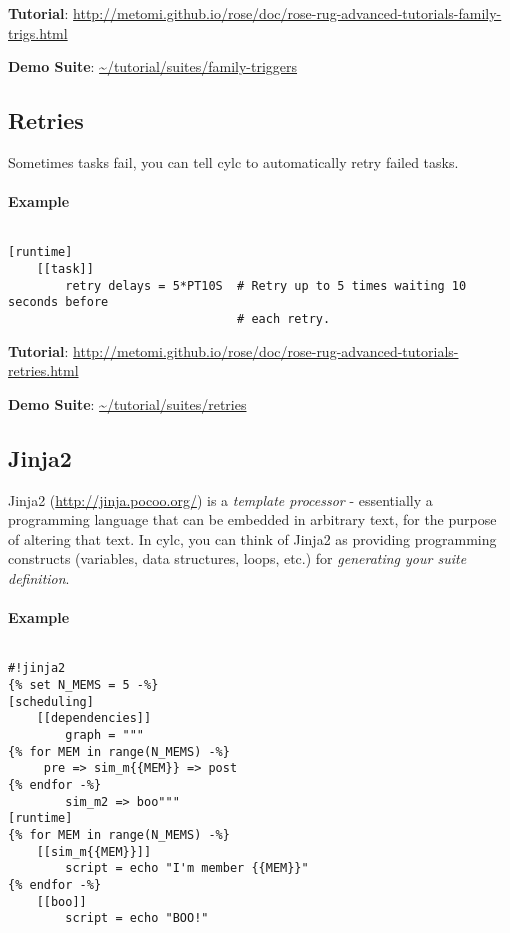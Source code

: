 \begin{shaded*}
\textbf{Tutorial}:
\url{http://metomi.github.io/rose/doc/rose-rug-advanced-tutorials-family-trigs.html}

\textbf{Demo Suite}: \url{~/tutorial/suites/family-triggers}
\end{shaded*}

\subsection{Retries}
Sometimes tasks fail, you can tell cylc to automatically retry failed tasks.

\paragraph*{Example} $ $

\begin{lstlisting}
[runtime]
    [[task]]
        retry delays = 5*PT10S  # Retry up to 5 times waiting 10 seconds before
                                # each retry.
\end{lstlisting}

\begin{shaded*}
\textbf{Tutorial}:
\url{http://metomi.github.io/rose/doc/rose-rug-advanced-tutorials-retries.html}

\textbf{Demo Suite}:
\url{~/tutorial/suites/retries}
\end{shaded*}


\subsection{Jinja2}

Jinja2 (\url{http://jinja.pocoo.org/}) is a {\em template processor} -
essentially a programming language that can be embedded in arbitrary text,
for the purpose of altering that text.  In cylc, you can think of
Jinja2 as providing programming constructs (variables, data structures,
loops, etc.) for {\em generating your suite definition}.

\paragraph{Example} $ $

\begin{lstlisting}
#!jinja2
{% set N_MEMS = 5 -%}
[scheduling]
    [[dependencies]]
        graph = """
{% for MEM in range(N_MEMS) -%}
     pre => sim_m{{MEM}} => post
{% endfor -%}
        sim_m2 => boo"""
[runtime]
{% for MEM in range(N_MEMS) -%}
    [[sim_m{{MEM}}]]
        script = echo "I'm member {{MEM}}"
{% endfor -%}
    [[boo]]
        script = echo "BOO!"
\end{lstlisting}

